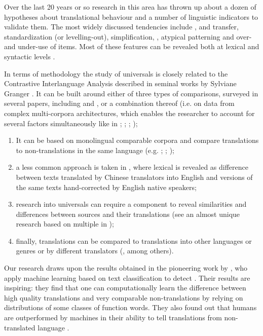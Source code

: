 \documentclass[output=paper]{langsci/langscibook.cls}
\begin{document}
Over the last 20 years or so research in this area has thrown up about a dozen of hypotheses about translational behaviour and a number of linguistic indicators to validate them. The most widely discussed tendencies include ,  and transfer, standardization (or levelling-out), simplification, , atypical patterning and over- and under-use of items. Most of these features can be revealed both at lexical and syntactic levels \citep{zanettin2013corpus}. 

In terms of methodology the study of universals is closely related to the Contrastive Interlanguage Analysis described in seminal works by Sylviane Granger \citep{granger2010comparable,granger2015contrastive}. It can be built around either of three types of comparisons, surveyed in several papers, including \citet{chesterman2010study} and \citet{xiao2010pursuit}, or a combination thereof (i.e. on data from complex multi-corpora architectures, which enables the researcher to account for several factors simultaneously like in \citet{pastor2008translation}; \citet{hansen2011between}; \citet{dai2011sl}; \citet{bernardini2007collocations}); 
\begin{enumerate}
\item It can be based on monolingual comparable corpora and compare translations to non-translations in the same language (e.g. \citet{laviosa1998core}; \citet{olohan2001spelling}; \citet{xiao2010pursuit});
\item  a less common approach is taken in \citet{rayson2008quantitative}, where lexical  is revealed as difference between texts translated by Chinese translators into English and versions of the same texts hand-corrected by English native speakers;
\item research into universals can require a  component to reveal similarities and differences between sources and their translations (see an almost unique research based on multiple  in \citealt{castagnoli2011exploring}); 
\item finally, translations can be compared to translations into other languages or genres or by different translators (\citealt{baker2004corpus}, among others).  
\end{enumerate}

Our research draws upon the results obtained in the pioneering work by \citet{baroni2005new}, who apply machine learning based on text classification to detect . Their results are inspiring: they find that one can computationally learn the difference between high quality translations and very comparable non-translations by relying on distributions of some classes of function words. They also found out that humans are outperformed by machines in their ability to tell translations from non-translated language \citep{baroni2005new}. 
\end{document}
